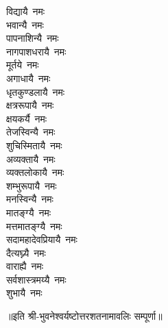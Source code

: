 \begin{flushleft}
\begin{multicols}{2}
विद्यायै~नमः\\
भवान्यै~नमः\\
पापनाशिन्यै~नमः\\
नागपाशधरायै~नमः\hfill{}\\
मूर्तये~नमः\\
अगाधायै~नमः\\
धृतकुण्डलायै~नमः\\
क्षत्ररूपायै~नमः\\
क्षयकर्यै~नमः\\
तेजस्विन्यै~नमः\\
शुचिस्मितायै~नमः\\
अव्यक्तायै~नमः\\
व्यक्तलोकायै~नमः\\
शम्भुरूपायै~नमः\hfill{}\\
मनस्विन्यै~नमः\\
मातङ्ग्यै~नमः\\
मत्तमातङ्ग्यै~नमः\\
सदामहादेवप्रियायै~नमः\\
दैत्यघ्न्यै~नमः\\
वाराह्यै~नमः\\
सर्वशास्त्रमय्यै~नमः\\
शुभायै~नमः\\
\end{multicols}
\end{flushleft}
॥इति श्री-भुवनेश्वर्यष्टोत्तरशतनामावलिः सम्पूर्णा॥
